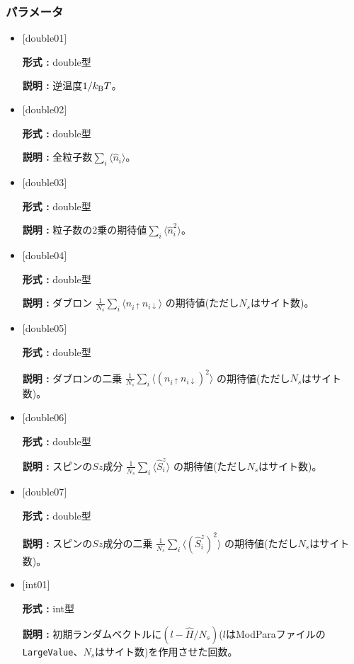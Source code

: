\subsubsection{パラメータ}
 \begin{itemize}

  \item  $[$double01$]$
  
 {\bf 形式 :} double型

{\bf 説明 :} 逆温度$1/{k_{\rm B}T}$。
 
  \item $[$double02$]$

 {\bf 形式 :} double型 

{\bf 説明 :}  全粒子数$\sum_{i} \langle \hat{n}_i \rangle$。

  \item $[$double03$]$

 {\bf 形式 :} double型 

{\bf 説明 :} 粒子数の2乗の期待値$\sum_{i} \langle \hat{n}_i^2 \rangle$。

  \item $[$double04$]$

 {\bf 形式 :} double型 

{\bf 説明 :} ダブロン
$\frac{1}{N_s} \sum_{i}\langle n_{i\uparrow}n_{i\downarrow}\rangle$ の期待値(ただし$N_s$はサイト数)。

  \item $[$double05$]$

 {\bf 形式 :} double型 

{\bf 説明 :} ダブロンの二乗
$\frac{1}{N_s} \sum_{i}\langle (n_{i\uparrow} n_{i\downarrow})^2\rangle$ の期待値(ただし$N_s$はサイト数)。

  \item $[$double06$]$

 {\bf 形式 :} double型 

{\bf 説明 :} スピンの$Sz$成分
$\frac{1}{N_s} \sum_{i}\langle \hat{S}_i^z\rangle$ の期待値(ただし$N_s$はサイト数)。

  \item $[$double07$]$

 {\bf 形式 :} double型 

{\bf 説明 :} スピンの$Sz$成分の二乗
$\frac{1}{N_s} \sum_{i}\langle (\hat{S}_i^z)^2\rangle$ の期待値(ただし$N_s$はサイト数)。

  \item $[$int01$]$

 {\bf 形式 :} int型 

{\bf 説明 :} 初期ランダムベクトルに$(l-\hat{H}/N_{s})$($l$はModParaファイルの\verb|LargeValue|、$N_{s}$はサイト数)を作用させた回数。

 \end{itemize}

